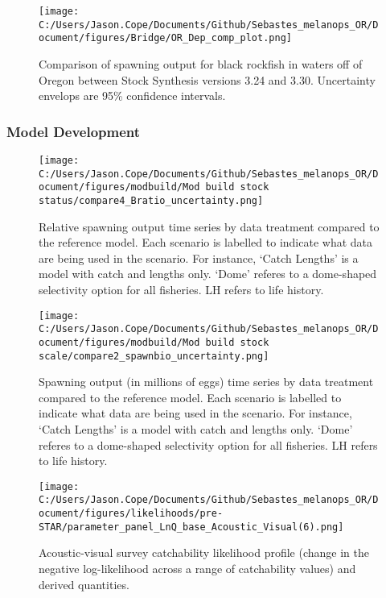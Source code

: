 \documentclass[11pt,
  english,
  letterpaper,
]{article}
\begin{document}
\newpage

\begin{figure}
\centering
\texttt{[image: C:/Users/Jason.Cope/Documents/Github/Sebastes\_melanops\_OR/Document/figures/Bridge/OR\_Dep\_comp\_plot.png]}
\caption{Comparison of spawning output for black rockfish in waters off of Oregon between Stock Synthesis versions 3.24 and 3.30. Uncertainty envelops are 95\% confidence intervals.\label{fig:deps-bridge-comps}}
\end{figure}

\clearpage

\hypertarget{model-development}{%
\subsubsection{Model Development}\label{model-development}}

\begin{figure}
\centering
\texttt{[image: C:/Users/Jason.Cope/Documents/Github/Sebastes\_melanops\_OR/Document/figures/modbuild/Mod build stock status/compare4\_Bratio\_uncertainty.png]}
\caption{Relative spawning output time series by data treatment compared to the reference model. Each scenario is labelled to indicate what data are being used in the scenario. For instance, `Catch Lengths' is a model with catch and lengths only. `Dome' referes to a dome-shaped selectivity option for all fisheries. LH refers to life history.\label{fig:modbuild-data-depl}}
\end{figure}

\newpage

\begin{figure}
\centering
\texttt{[image: C:/Users/Jason.Cope/Documents/Github/Sebastes\_melanops\_OR/Document/figures/modbuild/Mod build stock scale/compare2\_spawnbio\_uncertainty.png]}
\caption{Spawning output (in millions of eggs) time series by data treatment compared to the reference model. Each scenario is labelled to indicate what data are being used in the scenario. For instance, `Catch Lengths' is a model with catch and lengths only. `Dome' referes to a dome-shaped selectivity option for all fisheries. LH refers to life history.\label{fig:modbuild-data-ssb}}
\end{figure}

\newpage

\begin{figure}
\centering
\texttt{[image: C:/Users/Jason.Cope/Documents/Github/Sebastes\_melanops\_OR/Document/figures/likelihoods/pre-STAR/parameter\_panel\_LnQ\_base\_Acoustic\_Visual(6).png]}
\caption{Acoustic-visual survey catchability likelihood profile (change in the negative log-likelihood across a range of catchability values) and derived quantities.\label{fig:AVq-profile}}
\end{figure}
\end{document}
